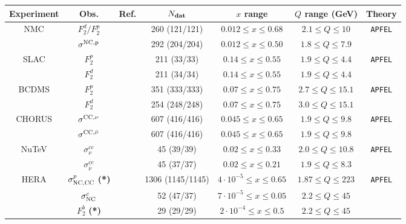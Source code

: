 
\begin{table}
\footnotesize
\begin{centering}
      \renewcommand{\arraystretch}{1.4}
  \begin{tabular}{|c|c|c|c|c|c|c|}
\hline
{Experiment} & Obs. & {Ref.}  & $ N_{\rm \bf dat}$ & $x$ range  & $Q$ range (GeV)  & Theory \tabularnewline
\hline
\hline
\multirow{2}{*}{NMC}
&   $F_2^d/F_2^p$ & \cite{Arneodo:1996kd}&   260 (121/121) & $ 0.012\le x \le 0.68$
& $ 2.1 \le Q \le 10 $  &\multirow{2}{*}{\tt APFEL}\tabularnewline
&   $\sigma^{\rm NC,p}$ & \cite{Arneodo:1996qe} & 292 (204/204) &
$0.012 \le x \le 0.50$ & $ 1.8 \le Q \le 7.9 $  &  \tabularnewline
\hline
\multirow{2}{*}{SLAC} &   $F_2^p$ & \cite{Whitlow:1991uw} &  211 (33/33)
& $ 0.14\le x \le 0.55$  &
$ 1.9 \le Q \le 4.4 $  & \multirow{2}{*}{\tt APFEL}\tabularnewline
&   $F_2^d$ & \cite{Whitlow:1991uw}& 211 (34/34) &
$ 0.14 \le x \le 0.55 $ & $ 1.9\le Q \le 4.4 $  & \tabularnewline
\hline
\multirow{2}{*}{BCDMS} &   $F_2^p$ & \cite{bcdms1}&  351 (333/333) & $0.07 \le x \le 0.75$ & $
2.7\le Q \le 15.1 $  &
\multirow{2}{*}{\tt APFEL}\tabularnewline
&   $F_2^d$ & \cite{bcdms2}&  254 (248/248) & $0.07 \le x \le 0.75$ & $ 3.0\le  Q \le
15.1$  & \tabularnewline
\hline
\multirow{2}{*}{CHORUS} &  $\sigma^{\rm CC,\nu}$  & \cite{Onengut:2005kv} & 607 (416/416) &
$0.045 \le x \le 0.65 $  &
$ 1.9\le Q \le 9.8 $  &
\multirow{2}{*}{\tt APFEL} \tabularnewline
&   $\sigma^{\rm CC,\bar{\nu}}$ & \cite{Onengut:2005kv} & 607 (416/416)  & $0.045 \le x \le 0.65$  &
$ 1.9 \le Q \le 9.8 $  & \tabularnewline
\hline
\multirow{2}{*}{NuTeV} &    $\sigma_\nu^{cc}$ & \cite{Goncharov:2001qe,MasonPhD} & 45 (39/39)
&$ 0.02 \le x \le 0.33 $ &
$ 2.0 \le Q \le 10.8  $ 
& \multirow{2}{*}{\tt APFEL} \tabularnewline
&   $\sigma_{\bar{\nu}}^{cc}$ & \cite{Goncharov:2001qe,MasonPhD} & 45 (37/37) &
$ 0.02 \le x \le 0.21$&
$ 1.9 \le Q \le 8.3 $ 
&\tabularnewline
\hline
\multirow{3}{*}{HERA}  &  $\sigma_{\rm NC,CC}^{p}$ {\bf (*)} & \cite{Abramowicz:2015mha}
&  1306 (1145/1145)  & $4\cdot 10^{-5}\le x \le 0.65$ & $ 1.87 \le Q \le 223 $   & \multirow{3}{*}{\tt APFEL}
 \tabularnewline
  & $\sigma_{\rm NC}^{c}$    & \cite{Abramowicz:1900rp} & 52 (47/37) & $7 \cdot 10^{-5} \le x \le 0.05$  & $2.2 \le Q \le 45$  &
 \tabularnewline
 &  $F_2^b$   {\bf (*)} & \cite{Aaron:2009af,Abramowicz:2014zub} & 29 (29/29) & $ 2\cdot 10^{-4}\le x \le
 0.5 $ & $ 2.2 \le Q \le 45$  &

\end{tabular}
\end{centering}
\end{table}
